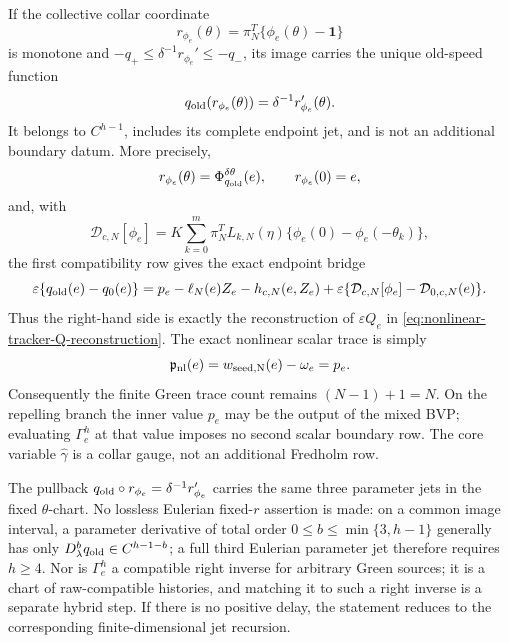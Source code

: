 \begin{proposition}
If the collective collar coordinate
\begin{equation}
 r_{\phi_e}(\theta)=\pi_N^T\{\phi_e(\theta)-\mathbf1\}         \label{eq:collar-collective-coordinate}
\end{equation}
is monotone and
\(-q_+\le\delta^{-1}r_{\phi_e}'\le-q_-\), its image carries the unique
old-speed function
\begin{equation}
 q_{\rm old}(r_{\phi_e}(\theta))
 =\delta^{-1}r_{\phi_e}'(\theta).                  \label{eq:collar-derived-old-speed}
\end{equation}
It belongs to \(C^{h-1}\), includes its complete endpoint jet, and is not
an additional boundary datum.  More precisely,
\begin{equation}
 r_{\phi_e}(\theta)=\Phi_{q_{\rm old}}^{\delta\theta}(e),
 \qquad r_{\phi_e}(0)=e,                           \label{eq:collar-backtrack-bridge}
\end{equation}
and, with
\[
 \mathcal D_{c,N}[\phi_e]
 =K\sum_{k=0}^m\pi_N^TL_{k,N}(\eta)
       \{\phi_e(0)-\phi_e(-\theta_k)\},
\]
the first compatibility row gives the exact endpoint bridge
\begin{equation}
 \varepsilon\{q_{\rm old}(e)-q_0(e)\}
 =p_e-\ell_N(e)Z_e-h_{c,N}(e,Z_e)
  +\varepsilon\{\mathcal D_{c,N}[\phi_e]
                    -\mathcal D_{0,c,N}(e)\}.     \label{eq:collar-speed-defect-bridge}
\end{equation}
Thus the right-hand side is exactly the reconstruction of
\(\varepsilon Q_e\) in
\cref{eq:nonlinear-tracker-Q-reconstruction}.  The exact nonlinear scalar
trace is simply
\begin{equation}
 \mathfrak p_{\rm nl}(e)=w_{\rm seed,N}(e)-\omega_e=p_e.      \label{eq:collar-nonlinear-trace}
\end{equation}
Consequently the finite Green trace count remains
\((N-1)+1=N\).  On the repelling branch the inner value \(p_e\) may be the
output of the mixed BVP; evaluating \(\Gamma_e^h\) at that value imposes no
second scalar boundary row.  The core variable \(\widehat\gamma\) is a
collar gauge, not an additional Fredholm row.

The pullback
\(q_{\rm old}\circ r_{\phi_e}=\delta^{-1}r_{\phi_e}'\) carries the same
three parameter jets in the fixed \(\theta\)-chart.  No lossless Eulerian
fixed-\(r\) assertion is made: on a common image interval, a parameter
derivative of total order \(0\le b\le\min\{3,h-1\}\) generally has only
\(D_\lambda^bq_{\rm old}\in C^{h-1-b}\); a full third Eulerian parameter
jet therefore requires \(h\ge4\).  Nor is
\(\Gamma_e^h\) a compatible right inverse for arbitrary Green sources; it
is a chart of raw-compatible histories, and matching it to such a right
inverse is a separate hybrid step.  If there is no positive delay, the
statement reduces to the corresponding finite-dimensional jet recursion.
\end{proposition}

